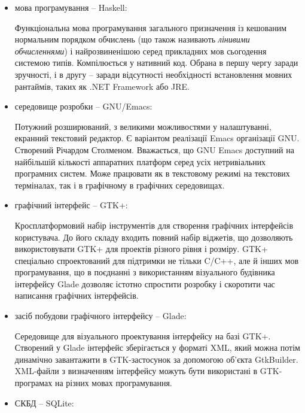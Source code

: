 \begin{itemize}\itemsep1em

  \item мова програмування -- Haskell\cite{haskell}:

    Функціональна мова програмування загального призначення із кешованим нормальним порядком обчислень (що також називають \emph{лінивими обчисленнями}) і найрозвиненішою серед прикладних мов сьогодення системою типів. Компілюється у нативний код. Обрана в першу чергу заради зручності, і в другу -- заради відсутності необхідності встановлення мовних рантаймів, таких як .NET Framework або JRE.

  \item середовище розробки -- GNU/Emacs\cite{emacs}:

    Потужний розширюваний, з великими можливостями у налаштуванні, екранний текстовий редактор. Є варіантом реалізації Emacs організації GNU. Створений Річардом Столменом. Вважається, що GNU Emacs доступний на найбільшій кількості аппаратних платформ серед усіх нетривіальних програмних систем. Може працювати як в текстовому режимі на текстових терміналах, так і в графічному в графічних середовищах.

  \item графічний інтерфейс -- GTK+\cite{gtk}:

    Кросплатформовий набір інструментів для створення графічних інтерфейсів користувача. До його складу входить повний набір віджетів, що дозволяють використовувати GTK+ для проектів різного рівня і розміру. GTK+ спеціально спроектований для підтримки не тільки C/C++, але й інших мов програмування, що в поєднанні з використанням візуального будівника інтерфейсу Glade дозволяє істотно спростити розробку і скоротити час написання графічних інтерфейсів.

  \item засіб побудови графічного інтерфейсу -- Glade\cite{glade}:

    Середовище для візуального проектування інтерфейсу на базі GTK+. Створений у Glade інтерфейс зберігається у форматі XML, який можна потім динамічно завантажити в GTK-застосунок за допомогою об'єкта GtkBuilder. XML-файли з визначенням інтерфейсу можуть бути використані в GTK-програмах на різних мовах програмування.

  \item СКБД -- SQLite\cite{sqlite}:


\end{itemize}
